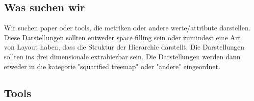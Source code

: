 \smallskip

\subsection{Was suchen wir} 
Wir suchen paper oder tools, die metriken oder andere werte/attribute darstellen.
Diese Darstellungen sollten entweder space filling sein oder zumindest eine Art von Layout haben, dass die Struktur der Hierarchie darstellt.
Die Darstellungen sollten ins drei dimensionale extrahierbar sein. 
Die Darstellungen werden dann etweder in die kategorie "squarified treemap" oder "andere" eingeordnet.



\subsection{Tools}

